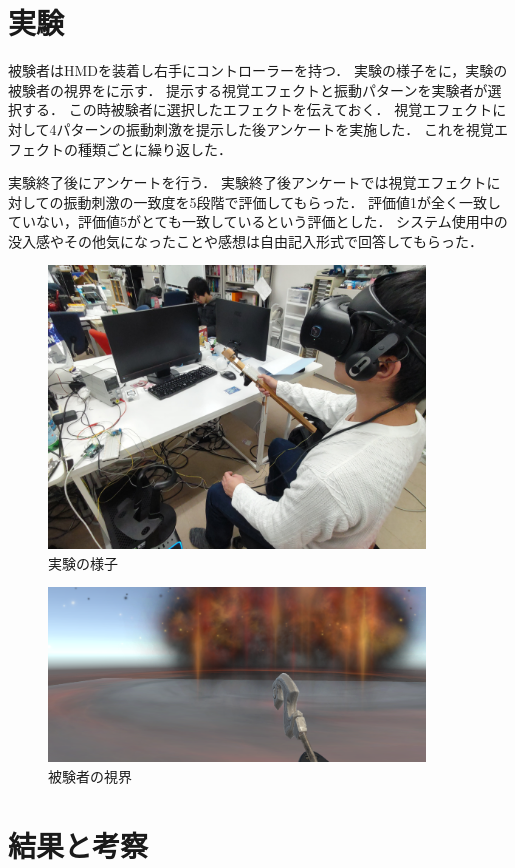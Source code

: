 \section{実験}
被験者はHMDを装着し右手にコントローラーを持つ．
実験の様子をに，実験の被験者の視界をに示す．
提示する視覚エフェクトと振動パターンを実験者が選択する．
この時被験者に選択したエフェクトを伝えておく．
視覚エフェクトに対して4パターンの振動刺激を提示した後アンケートを実施した．
これを視覚エフェクトの種類ごとに繰り返した．


実験終了後にアンケートを行う．
実験終了後アンケートでは視覚エフェクトに対しての振動刺激の一致度を5段階で評価してもらった．
評価値1が全く一致していない，評価値5がとても一致しているという評価とした．
システム使用中の没入感やその他気になったことや感想は自由記入形式で回答してもらった．
\begin{figure}[h]
\centering
\includegraphics[clip,width=10cm]{./fig/jikken.png}
\caption{実験の様子}\label{jikken}
\end{figure}
\begin{figure}[h]
\centering
\includegraphics[clip,width=10cm]{./fig/unity.png}
\caption{被験者の視界}\label{first}
\end{figure}


\newpage


\section{結果と考察}
